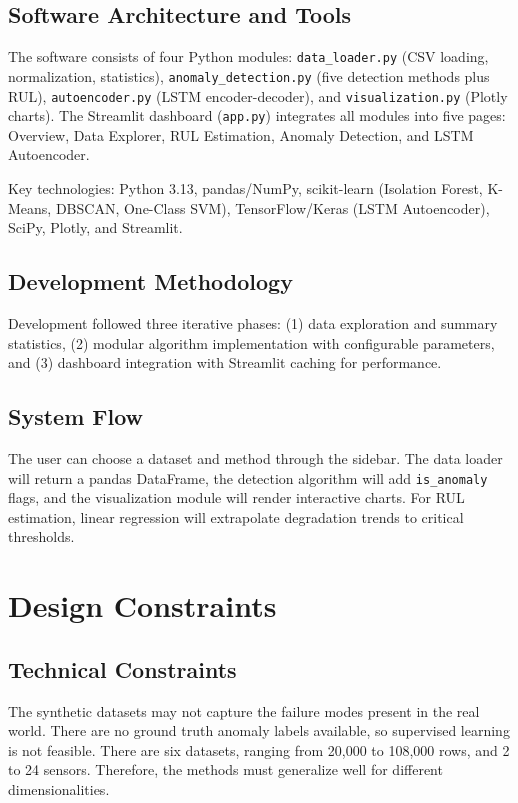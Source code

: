 \documentclass{CLS_zhou430}
\begin{document}
\section{Software Architecture and Tools}
The software consists of four Python modules: \texttt{data\_loader.py} (CSV loading, normalization, statistics), \texttt{anomaly\_detection.py} (five detection methods plus RUL), \texttt{autoencoder.py} (LSTM encoder-decoder), and \texttt{visualization.py} (Plotly charts). The Streamlit dashboard (\texttt{app.py}) integrates all modules into five pages: Overview, Data Explorer, RUL Estimation, Anomaly Detection, and LSTM Autoencoder.

Key technologies: Python 3.13, pandas/NumPy, scikit-learn \cite{pedregosa2011scikit} (Isolation Forest, K-Means, DBSCAN, One-Class SVM), TensorFlow/Keras \cite{tensorflow2015} (LSTM Autoencoder), SciPy, Plotly, and Streamlit.

\section{Development Methodology}
Development followed three iterative phases: (1) data exploration and summary statistics, (2) modular algorithm implementation with configurable parameters, and (3) dashboard integration with Streamlit caching for performance.

\section{System Flow}
The user can choose a dataset and method through the sidebar. The data loader will return a pandas DataFrame, the detection algorithm will add \texttt{is\_anomaly} flags, and the visualization module will render interactive charts. For RUL estimation, linear regression will extrapolate degradation trends to critical thresholds.


\chapter{Design Constraints}

\section{Technical Constraints}
The synthetic datasets may not capture the failure modes present in the real world. There are no ground truth anomaly labels available, so supervised learning is not feasible. There are six datasets, ranging from 20,000 to 108,000 rows, and 2 to 24 sensors. Therefore, the methods must generalize well for different dimensionalities. 
\end{document}
